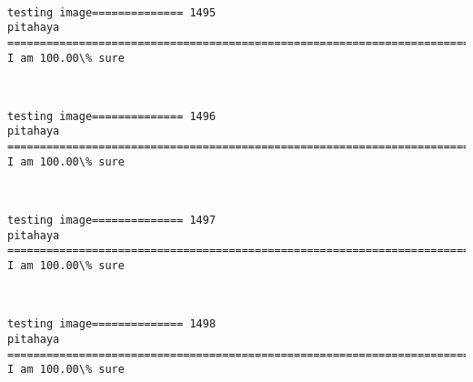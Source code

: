 \documentclass[11pt]{article}
\begin{document}
    \begin{center}
    \end{center}
    { \hspace*{\fill} \\}
    
    \begin{Verbatim}[commandchars=\\\{\}]
testing image============== 1495
pitahaya
============================================================================
I am 100.00\% sure

    \end{Verbatim}

    \begin{center}
    \end{center}
    { \hspace*{\fill} \\}
    
    \begin{Verbatim}[commandchars=\\\{\}]
testing image============== 1496
pitahaya
============================================================================
I am 100.00\% sure

    \end{Verbatim}

    \begin{center}
    \end{center}
    { \hspace*{\fill} \\}
    
    \begin{Verbatim}[commandchars=\\\{\}]
testing image============== 1497
pitahaya
============================================================================
I am 100.00\% sure

    \end{Verbatim}

    \begin{center}
    \end{center}
    { \hspace*{\fill} \\}
    
    \begin{Verbatim}[commandchars=\\\{\}]
testing image============== 1498
pitahaya
============================================================================
I am 100.00\% sure

    \end{Verbatim}
\end{document}
